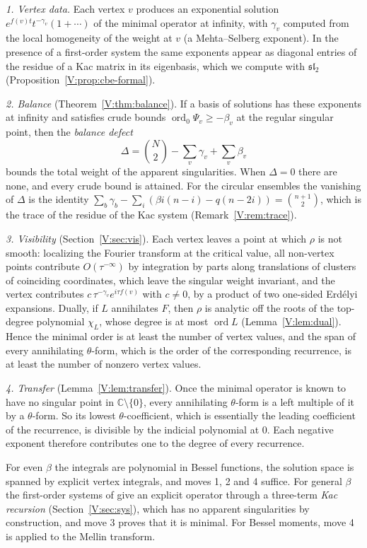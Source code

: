 \documentclass[11pt,a4paper]{article}
\theoremstyle{definition}
\theoremstyle{remark}
\newcommand{\C}{\mathbb C}
\DeclareMathOperator{\ord}{ord}
\numberwithin{equation}{section}
\begin{document}
\emph{1. Vertex data.} Each vertex $v$ produces an exponential solution $e^{f(v)t}t^{-\gamma_v}(1+\cdots)$ of the minimal operator at infinity, with $\gamma_v$ computed from the local homogeneity of the weight at $v$ (a Mehta--Selberg exponent). In the presence of a first-order system the same exponents appear as diagonal entries of the residue of a Kac matrix in its eigenbasis, which we compute with $\mathfrak{sl}_2$ (Proposition~\ref{V:prop:cbe-formal}).

\emph{2. Balance} (Theorem~\ref{V:thm:balance}). If a basis of solutions has these exponents at infinity and satisfies crude bounds $\ord_0\Psi_v\ge-\beta_v$ at the regular singular point, then the \emph{balance defect}
\[
\Delta=\binom N2-\sum_v\gamma_v+\sum_v\beta_v
\]
bounds the total weight of the apparent singularities. When $\Delta=0$ there are none, and every crude bound is attained. For the circular ensembles the vanishing of $\Delta$ is the identity $\sum_b\gamma_b-\sum_i(\beta i(n-i)-q(n-2i))=\binom{n+1}2$, which is the trace of the residue of the Kac system (Remark~\ref{V:rem:trace}).

\emph{3. Visibility} (Section~\ref{V:sec:vis}). Each vertex leaves a point at which $\rho$ is not smooth: localizing the Fourier transform at the critical value, all non-vertex points contribute $O(\tau^{-\infty})$ by integration by parts along translations of clusters of coinciding coordinates, which leave the singular weight invariant, and the vertex contributes $c\,\tau^{-\gamma_v}e^{i\tau f(v)}$ with $c\ne0$, by a product of two one-sided Erd\'elyi expansions. Dually, if $L$ annihilates $F$, then $\rho$ is analytic off the roots of the top-degree polynomial $\chi_L$, whose degree is at most $\ord L$ (Lemma~\ref{V:lem:dual}). Hence the minimal order is at least the number of vertex values, and the span of every annihilating $\theta$-form, which is the order of the corresponding recurrence, is at least the number of nonzero vertex values.

\emph{4. Transfer} (Lemma~\ref{V:lem:transfer}). Once the minimal operator is known to have no singular point in $\C\setminus\{0\}$, every annihilating $\theta$-form is a left multiple of it by a $\theta$-form. So its lowest $\theta$-coefficient, which is essentially the leading coefficient of the recurrence, is divisible by the indicial polynomial at $0$. Each negative exponent therefore contributes one to the degree of every recurrence.

For even $\beta$ the integrals are polynomial in Bessel functions, the solution space is spanned by explicit vertex integrals, and moves 1, 2 and 4 suffice. For general $\beta$ the first-order systems of \cite{FK22,FW26} give an explicit operator through a three-term \emph{Kac recursion} (Section~\ref{V:sec:sys}), which has no apparent singularities by construction, and move 3 proves that it is minimal. For Bessel moments, move 4 is applied to the Mellin transform.
\end{document}
